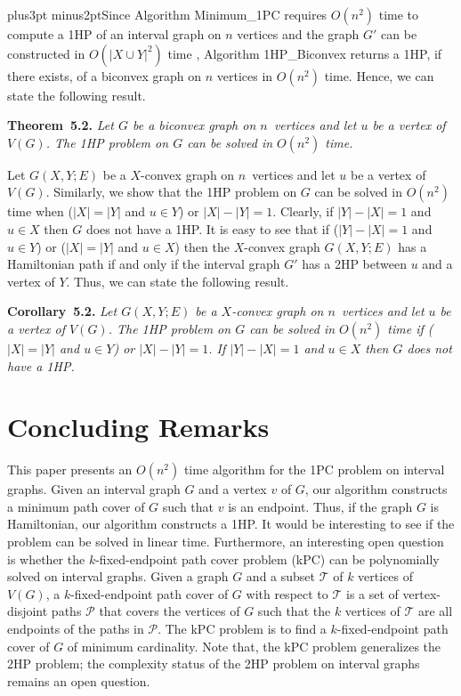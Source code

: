 \documentclass[10pt]{article}
\def\yskip{\penalty-50\vskip3pt plus3pt minus2pt}
\def\y{\yskip}
\begin{document}
{\y Since Algorithm Minimum\_1PC requires $O(n^2)$ time to compute
a 1HP of an interval graph on $n$ vertices and the graph $G'$ can
be constructed in $O(|X \cup Y|^2)$ time \cite{Muller}, Algorithm
1HP\_Biconvex returns a 1HP, if there exists, of a biconvex graph
on $n$ vertices in $O(n^2)$ time. Hence, we can state the
following result.

\bigskip
\par\noindent
{\bf Theorem~5.2.} {\it Let $G$ be a biconvex graph on
$n$~vertices and let $u$ be a vertex of $V(G)$. The 1HP problem on
$G$ can be solved in $O(n^2)$ time.}

\bigskip Let $G(X,Y;E)$ be a $X$-convex graph on
$n$~vertices and let $u$ be a vertex of $V(G)$. Similarly, we show
that the 1HP problem on $G$ can be solved in $O(n^2)$ time when
($|X|=|Y|$ and $u \in Y$) or $|X|-|Y|=1$. Clearly, if $|Y|-|X|=1$
and $u \in X$ then $G$ does not have a 1HP. It is easy to see that
if ($|Y|-|X|=1$ and $u \in Y$) or ($|X|=|Y|$ and $u \in X$) then
the $X$-convex graph $G(X,Y;E)$ has a Hamiltonian path if and only
if the interval graph $G'$ has a 2HP between $u$ and a vertex of
$Y$. Thus, we can state the following result.

\bigskip
\par\noindent
{\bf Corollary~5.2.} {\it Let $G(X,Y;E)$ be a $X$-convex graph on
$n$~vertices and let $u$ be a vertex of $V(G)$. The 1HP problem on
$G$ can be solved in $O(n^2)$ time if ($|X|=|Y|$ and $u \in Y$) or
$|X|-|Y|=1$. If $|Y|-|X|=1$ and $u \in X$ then $G$ does not have a
1HP.}



\vskip 0.3in \section{Concluding Remarks}

This paper presents an $O(n^2)$ time algorithm for the 1PC problem
on interval graphs. Given an interval graph $G$ and a vertex $v$
of $G$, our algorithm constructs a minimum path cover of $G$ such
that $v$ is an endpoint. Thus, if the graph $G$ is Hamiltonian,
our algorithm constructs a 1HP. It would be interesting to see if
the problem can be solved in linear time. Furthermore, an
interesting open question is whether the $k$-fixed-endpoint path
cover problem (kPC) can be polynomially solved on interval graphs.
Given a graph $G$ and a subset $\mathcal{T}$ of $k$ vertices of
$V(G)$, a $k$-fixed-endpoint path cover of $G$ with respect to
$\mathcal{T}$ is a set of vertex-disjoint paths $\mathcal{P}$ that
covers the vertices of $G$ such that the $k$ vertices of
$\mathcal{T}$ are all endpoints of the paths in $\mathcal{P}$. The
kPC problem is to find a $k$-fixed-endpoint path cover of $G$ of
minimum cardinality. Note that, the kPC problem generalizes the
2HP problem; the complexity status of the 2HP problem on interval
graphs remains an open question. }
\end{document}
